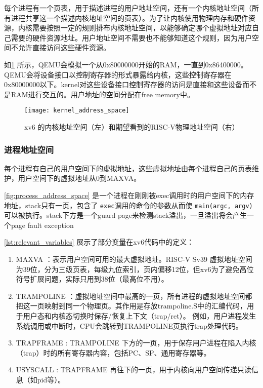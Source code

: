 {每个进程有一个页表，用于描述进程的用户地址空间，还有一个内核地址空间（所有进程共享这一个描述内核地址空间的页表）。为了让内核使用物理内存和硬件资源，内核需要按照一定的规则排布内核地址空间，以能够确定哪个虚拟地址对应自己需要的硬件资源地址。用户地址空间不需要也不能够知道这个规则，因为用户空间不允许直接访问这些硬件资源。

如\cref{fig:kernel_address_space} 所示，QEMU会模拟一个从0x80000000开始的RAM，一直到0x86400000。QEMU会将设备接口以控制寄存器的形式暴露给内核，这些控制寄存器在0x80000000以下。kernel对这些设备接口控制寄存器的访问是直接和这些设备而不是RAM进行交互的。用户地址的空间分配在free memory中。

\begin{figure}[!htb]
	\centering
	\texttt{[image: kernel\_address\_space]}
	\caption{xv6 的内核地址空间（左）和期望看到的RISC-V物理地址空间（右）}
	\label{fig:kernel_address_space}
\end{figure}

\subsubsection{进程地址空间}

每个进程有自己的用户空间下的虚拟地址，这些虚拟地址由每个进程自己的页表维护，用户空间下的虚拟地址从0到MAXVA。

\cref{fig:process_address_space} 是一个进程在刚刚被exec调用时的用户空间下的内存地址，stack只有一页，包含了 \texttt{exec}调用的命令的参数从而使 \texttt{main(argc, argv)} 可以被执行。stack下方是一个guard page来检测stack溢出，一旦溢出将会产生一个page fault exception

\cref{lst:relevant_variables} 展示了部分变量在xv6代码中的定义：
\begin{enumerate}
	\item MAXVA ：表示用户空间可用的最大虚拟地址。RISC-V Sv39 虚拟地址空间为39位，分为三级页表，每级九位索引，页内偏移12位，但xv6为了避免高位符号扩展问题，实际只用到38位（最高位不用）。
	\item TRAMPOLINE ：虚拟地址空间中最高的一页，所有进程的虚拟地址空间都把这一页映射到同一个物理页。其作用是存放trampoline.S中的汇编代码，用于用户态和内核态切换时保存/恢复上下文（trap/ret）。
	例如，用户进程发生系统调用或中断时，CPU会跳转到TRAMPOLINE页执行trap处理代码。
	\item TRAPFRAME : TRAMPOLINE 下方的一页，用于保存用户进程在陷入内核（trap）时的所有寄存器内容，包括PC、SP、通用寄存器等。
	\item USYSCALL : TRAPFRAME 再往下的一页，用于内核向用户空间传递只读信息（如pid等）。
\end{enumerate}

}
